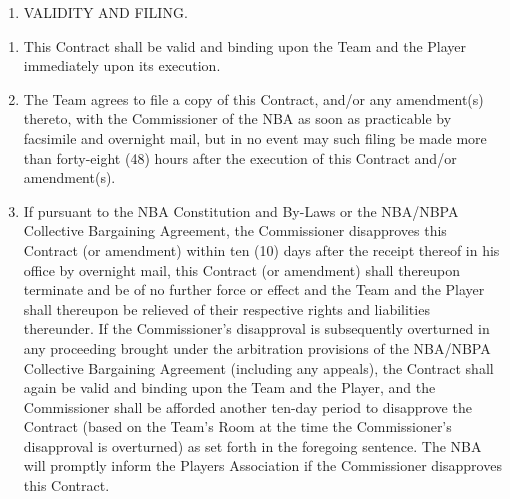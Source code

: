 \documentclass[
]{book}
\providecommand{\tightlist}{%
  \setlength{\itemsep}{0pt}\setlength{\parskip}{0pt}}
\begin{document}
\begin{enumerate}
\def\labelenumi{\arabic{enumi}.}
\setcounter{enumi}{10}
\tightlist
\item
  VALIDITY AND FILING.
\end{enumerate}

\begin{enumerate}
\def\labelenumi{(\alph{enumi})}
\tightlist
\item
  This Contract shall be valid and binding upon the Team and the Player immediately upon its execution.
\item
  The Team agrees to file a copy of this Contract, and/or any amendment(s) thereto, with the Commissioner of the NBA as soon as practicable by facsimile and overnight mail, but in no event may such filing be made more than forty-eight (48) hours after the execution of this Contract and/or amendment(s).
\item
  If pursuant to the NBA Constitution and By-Laws or the NBA/NBPA Collective Bargaining Agreement, the Commissioner disapproves this Contract (or amendment) within ten (10) days after the receipt thereof in his office by overnight mail, this Contract (or amendment) shall thereupon terminate and be of no further force or effect and the Team and the Player shall thereupon be relieved of their respective rights and liabilities thereunder. If the Commissioner's disapproval is subsequently overturned in any proceeding brought under the arbitration provisions of the NBA/NBPA Collective Bargaining Agreement (including any appeals), the Contract shall again be valid and binding upon the Team and the Player, and the Commissioner shall be afforded another ten-day period to disapprove the Contract (based on the Team's Room at the time the Commissioner's disapproval is overturned) as set forth in the foregoing sentence. The NBA will promptly inform the Players Association if the Commissioner disapproves this Contract.
\end{enumerate}
\end{document}
